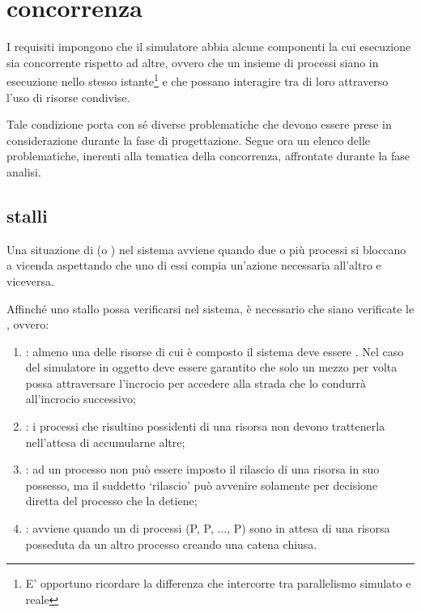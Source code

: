 \section*{concorrenza}
\label{problematiche_concorrenza}
I requisiti impongono che il simulatore abbia alcune componenti la cui esecuzione sia concorrente rispetto ad altre, ovvero che un insieme di processi siano in esecuzione nello stesso istante\footnote{E' opportuno ricordare la differenza che intercorre tra parallelismo simulato e reale} e che possano interagire tra di loro attraverso l'uso di risorse condivise.

Tale condizione porta con sé diverse problematiche che devono essere prese in considerazione durante la fase di progettazione. Segue ora un elenco delle problematiche, inerenti alla tematica della concorrenza, affrontate durante la fase analisi.

\subsection*{stalli}
\label{problematiche_concorrenza_stalli}
Una situazione di  (o ) nel sistema avviene quando due o più processi si bloccano a vicenda aspettando che uno di essi compia un'azione necessaria all'altro e viceversa.

Affinché uno stallo possa verificarsi nel sistema, è necessario che  siano verificate le , ovvero:

\begin{enumerate}
\item{: almeno una delle risorse di cui è composto il sistema deve essere . Nel caso del simulatore in oggetto deve essere garantito che solo un mezzo per volta possa attraversare l'incrocio per accedere alla strada che lo condurrà all'incrocio successivo;}
\item{: i processi che risultino possidenti di una risorsa non devono trattenerla nell'attesa di accumularne altre;}
\item{: ad un processo non può essere imposto il rilascio di una risorsa in suo possesso, ma il suddetto `rilascio' può avvenire solamente per decisione diretta del processo che la detiene;}
\item{: avviene quando un  di processi (P, P, ..., P) sono in attesa di una risorsa posseduta da un altro processo creando una catena chiusa.}
\end{enumerate}

